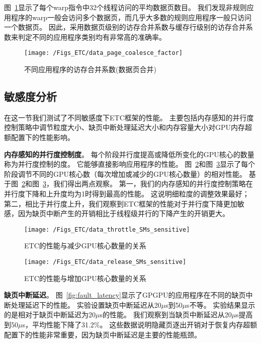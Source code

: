 图~\ref{fig:data_page_coalesce_factor}显示了每个warp指令中32个线程访问的平均数据页数目。
我们发现非规则应用程序的warp一般会访问多个数据页，而几乎大多数的规则应用程序一般只访问一个数据页。
因此，采用数据页级别的访存合并系数与缓存行级别的访存合并系数来判定不同的应用程序类别均有非常高的准确率。

\begin{figure}[htbp] %
  \centering
  \texttt{[image: /Figs\_ETC/data\_page\_coalesce\_factor]}
  \caption{不同应用程序的访存合并系数(数据页合并)}
  \label{fig:data_page_coalesce_factor}
\end{figure}

\subsection{敏感度分析}
在这一节我们测试了不同敏感度下ETC框架的性能。
主要包括内存感知的并行度控制策略中调节粒度大小、缺页中断处理延迟大小和内存容量大小对GPU内存超额配置下的性能影响。

\textbf{内存感知的并行度控制度}。
每个阶段并行度提高或降低所变化的GPU核心的数量称为并行度控制的度。
它能够直接影响应用程序的性能。
图~\ref{fig:data_throttle_SMs_sensitive}和图~\ref{fig:data_release_SMs_sensitive}显示了每个阶段调节不同的GPU核心数（每次增加或减少的GPU核心数量）的相对性能。
基于图~\ref{fig:data_throttle_SMs_sensitive}和图~\ref{fig:data_release_SMs_sensitive}，我们得出两点观察。
第一，我们的内存感知的并行度控制策略在并行度下降和上升度均为1时得到最高的性能。
这说明细粒度的调整效果最好；
第二，相比于并行度上升，我们观察到ETC框架的性能对于并行度下降更加敏感，因为缺页中断产生的开销相比于线程级并行的下降产生的开销更大。

\begin{figure}[htbp] %
  \centering
  \texttt{[image: /Figs\_ETC/data\_throttle\_SMs\_sensitive]}
  \caption{ETC的性能与减少GPU核心数量的关系}
  \label{fig:data_throttle_SMs_sensitive}
\end{figure}

\begin{figure}[htbp] %
  \centering
  \texttt{[image: /Figs\_ETC/data\_release\_SMs\_sensitive]}
  \caption{ETC的性能与增加GPU核心数量的关系}
  \label{fig:data_release_SMs_sensitive}
\end{figure}

\textbf{缺页中断延迟}。
图~\ref{fig:fault_latency}显示了GPGPU的应用程序在不同的缺页中断处理延迟下的性能。
实验设置缺页中断延迟从20$\mu$s到50$\mu$s不等。
实验结果显示的是相对于缺页中断延迟为20$\mu$s的性能。
我们观察到当缺页中断延迟从20$\mu$s提高到50$\mu$s，平均性能下降了31.2\%。
这些数据说明隐藏页逐出开销对于恢复内存超额配置下的性能非常重要，因为缺页中断延迟是主要的性能瓶颈。

